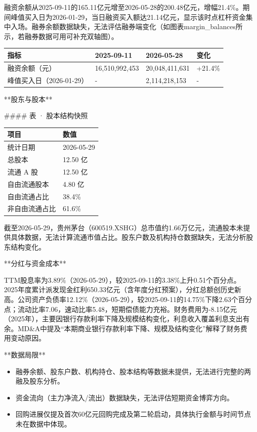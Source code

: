\documentclass[12pt,a4paper]{article}
\begin{document}
融资余额从2025-09-11的165.11亿元增至2026-05-28的200.48亿元，增幅21.4\%。期间峰值买入日为2026-01-29，当日融资买入额达21.14亿元，显示该时点杠杆资金集中入场。融券余额数据缺失，无法评估融券端变化（如图表margin\_balances所示，若融券数据可用可补充双轴图）。

\begin{table}[htbp]
\centering
\begin{tabular}{llll}
\toprule
指标 & 2025-09-11 & 2026-05-28 & 变化 \\
\midrule
融资余额（元） & 16,510,992,453 & 20,048,411,631 & +21.4\% \\
峰值买入日（2026-01-29） & - & 2,114,218,153 & - \\
\bottomrule
\end{tabular}
\end{table}


**股东与股本**

\#\#\#\# 表 · 股本结构快照

\begin{table}[htbp]
\centering
\begin{tabular}{ll}
\toprule
项目 & 数值 \\
\midrule
统计日期 & 2026-05-29 \\
总股本 & 12.50 亿 \\
流通 A 股 & 12.50 亿 \\
自由流通股本 & 4.80 亿 \\
自由流通占比 & 38.4\% \\
非自由流通占比 & 61.6\% \\
\bottomrule
\end{tabular}
\end{table}


截至2026-05-29，贵州茅台（600519.XSHG）总市值约1.66万亿元，流通股本未提供具体数据，无法计算流通市值占比。股东户数及机构持仓数据缺失，无法分析股东结构变化。

**分红与资金成本**

TTM股息率为3.89\%（2026-05-29），较2025-09-11的3.38\%上升0.51个百分点。2025年度累计派发现金红利650.33亿元（含年度分红预案），分红总额创历史新高。公司资产负债率12.12\%（2026-05-29），较2025-09-11的14.75\%下降2.63个百分点；流动比率7.06，速动比率5.48，短期偿债能力充裕。财务费用为-8.15亿元（2025年），主要因银行存款利率下降及规模结构变化，利息收入覆盖利息支出有余。MD\&A中提及“本期商业银行存款利率下降、规模及结构变化”解释了财务费用变动原因。

**数据局限**
\begin{itemize}
\item 融券余额、股东户数、机构持仓、股本结构等数据未提供，无法进行完整的两融及股东分析。
\item 资金流向（主力净流入/流出）数据缺失，无法评估短期资金博弈方向。
\item 回购进展仅提及首次60亿元回购完成及第二轮启动，具体执行金额与时间节点未在数据中体现。
\end{itemize}
\end{document}
